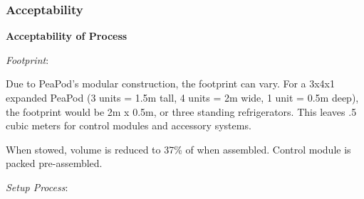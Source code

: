 \documentclass{report}
\begin{document}

\subsubsection{Acceptability}
\label{sec:acceptability}

\textbf{Acceptability of Process}
\label{sec:acceptability-process}



\textit{Footprint}:

Due to PeaPod's modular construction, the footprint can vary. For a 3x4x1 expanded PeaPod (3 units = 1.5m tall, 4 units = 2m wide, 1 unit = 0.5m deep), the footprint would be 2m x 0.5m, or three standing refrigerators. This leaves .5 cubic meters for control modules and accessory systems. 

When stowed, volume is reduced to 37\% of when assembled. Control module is packed pre-assembled.

\textit{Setup Process}:
\end{document}
